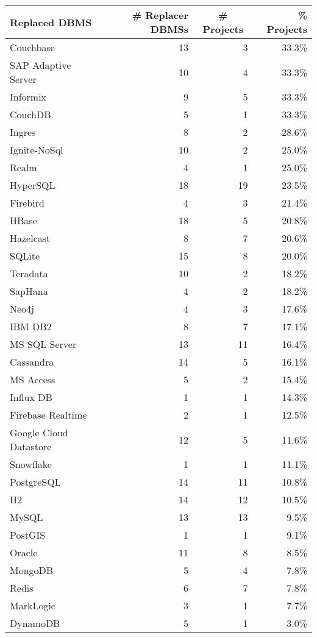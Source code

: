 \begin{tabular}{lrrr}
\hline
\multicolumn{1}{l}{\textbf{Replaced DBMS}} & \multicolumn{1}{r}{\textbf{\# Replacer DBMSs}} & \multicolumn{1}{c}{\textbf{\# Projects}} & \textbf{\% Projects} \\
\hline
Couchbase & 13 & 3 & 33.3\% \\
SAP Adaptive Server & 10 & 4 & 33.3\% \\
Informix & 9 & 5 & 33.3\% \\
CouchDB & 5 & 1 & 33.3\% \\
Ingres & 8 & 2 & 28.6\% \\
Ignite-NoSql & 10 & 2 & 25.0\% \\
Realm & 4 & 1 & 25.0\% \\
HyperSQL & 18 & 19 & 23.5\% \\
Firebird & 4 & 3 & 21.4\% \\
HBase & 18 & 5 & 20.8\% \\
Hazelcast & 8 & 7 & 20.6\% \\
SQLite & 15 & 8 & 20.0\% \\
Teradata & 10 & 2 & 18.2\% \\
SapHana & 4 & 2 & 18.2\% \\
Neo4j & 4 & 3 & 17.6\% \\
IBM DB2 & 8 & 7 & 17.1\% \\
MS SQL Server & 13 & 11 & 16.4\% \\
Cassandra & 14 & 5 & 16.1\% \\
MS Access & 5 & 2 & 15.4\% \\
Influx DB & 1 & 1 & 14.3\% \\
Firebase Realtime & 2 & 1 & 12.5\% \\
Google Cloud Datastore & 12 & 5 & 11.6\% \\
Snowflake & 1 & 1 & 11.1\% \\
PostgreSQL & 14 & 11 & 10.8\% \\
H2 & 14 & 12 & 10.5\% \\
MySQL & 13 & 13 & 9.5\% \\
PostGIS & 1 & 1 & 9.1\% \\
Oracle & 11 & 8 & 8.5\% \\
MongoDB & 5 & 4 & 7.8\% \\
Redis & 6 & 7 & 7.8\% \\
MarkLogic & 3 & 1 & 7.7\% \\
DynamoDB & 5 & 1 & 3.0\% \\
\hline
\end{tabular}
